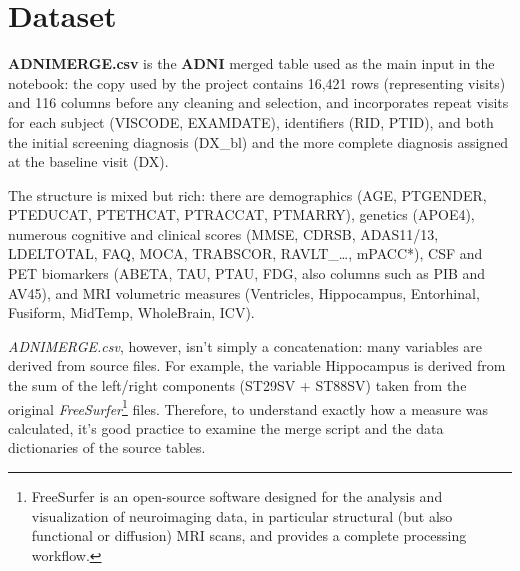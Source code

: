 \section{Dataset}
\textbf{ADNIMERGE.csv} is the \textbf{ADNI} merged table used as the main input in the notebook: the copy used by the project contains 16,421 rows (representing visits) and 116 columns before any cleaning and selection, and incorporates repeat visits for each subject (VISCODE, EXAMDATE), identifiers (RID, PTID), and both the initial screening diagnosis (DX\_bl) and the more complete diagnosis assigned at the baseline visit (DX).

The structure is mixed but rich: there are demographics (AGE, PTGENDER, PTEDUCAT, PTETHCAT, PTRACCAT, PTMARRY), genetics (APOE4), numerous cognitive and clinical scores (MMSE, CDRSB, ADAS11/13, LDELTOTAL, FAQ, MOCA, TRABSCOR, RAVLT\_…, mPACC*), CSF and PET biomarkers (ABETA, TAU, PTAU, FDG, also columns such as PIB and AV45), and MRI volumetric measures (Ventricles, Hippocampus, Entorhinal, Fusiform, MidTemp, WholeBrain, ICV).

\textit{ADNIMERGE.csv}, however, isn't simply a concatenation: many variables are derived from source files. For example, the variable Hippocampus is derived from the sum of the left/right components (ST29SV + ST88SV) taken from the original \textit{FreeSurfer}\footnote{FreeSurfer is an open-source software designed for the analysis and visualization of neuroimaging data, in particular structural (but also functional or diffusion) MRI scans, and provides a complete processing workflow.} files. Therefore, to understand exactly how a measure was calculated, it's good practice to examine the merge script and the data dictionaries of the source tables. 